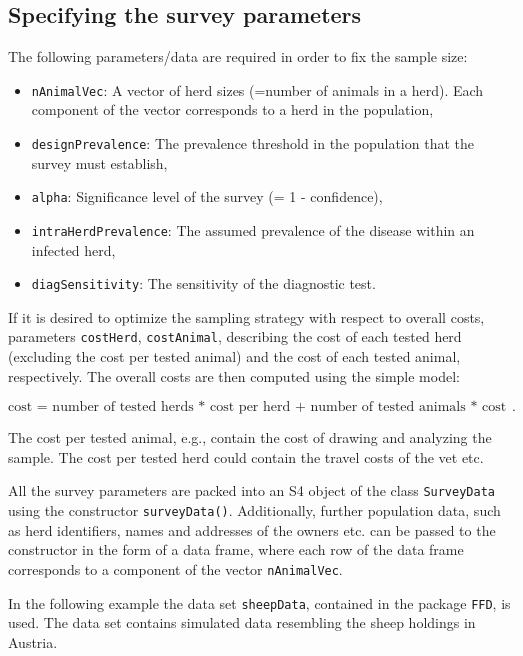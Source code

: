 \documentclass[nojss]{jss}
\begin{document}

\subsection{Specifying the survey parameters} \label{subsec:surveyData}

The following parameters/data are required in order to fix the sample size:

\begin{itemize}
%
\item \texttt{nAnimalVec}: A vector of herd sizes (=number of animals in a herd). Each component of the vector  corresponds to a herd in the population,
\item \texttt{designPrevalence}: The prevalence threshold in the population that the survey must establish,
\item \texttt{alpha}: Significance level of the survey (= 1 - confidence),
\item \texttt{intraHerdPrevalence}: The assumed prevalence of the disease within an infected herd,
\item \texttt{diagSensitivity}: The sensitivity of the diagnostic test.
%
\end{itemize}

If it is desired to optimize the sampling strategy with respect to overall costs, parameters \texttt{costHerd}, \texttt{costAnimal}, describing the cost of each tested herd (excluding the cost per tested animal) and the cost of each tested animal, respectively. The overall costs are then computed using the simple model:

$$\mbox{cost = number of tested herds * cost per herd + number of tested animals * cost per animal}.$$

The cost per tested animal, e.g., contain the cost of drawing and analyzing the sample. The cost per tested herd could contain the travel costs of the vet etc.

All the survey parameters are packed into an S4 object of the class \texttt{SurveyData}    using the constructor \texttt{surveyData()}.  Additionally, further population data, such as herd identifiers, names and addresses of the owners etc. can be passed to the constructor in the form of a data frame, where each row of the data frame corresponds to a component of the vector \texttt{nAnimalVec}.

In the following example the data set \texttt{sheepData}, contained in the package \texttt{FFD}, is used. The data set contains simulated data resembling the sheep holdings in Austria.
\end{document}
